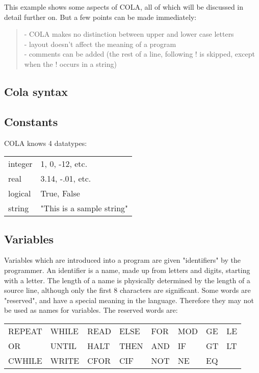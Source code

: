 This example shows some aspects of COLA, all of which will be
discussed in detail further on. But a few points can be made
immediately:

\begin{verse}
  -  COLA makes no distinction between upper and lower case letters\\
  -  layout doesn't affect the meaning of a program\\
  -  comments can be added (the rest of a line, following ! is
     skipped, except when the ! occurs in a string)\\
\end{verse}


\subsection{Cola syntax}
\subsection*{Constants}

COLA knows 4 datatypes:\\

\begin{tabular}{ l l}
integer &                  1, 0, -12, etc.\\
real    &                  3.14, -.01, etc.\\
logical &                  True, False\\
string  &                  "This is a sample string"\\
\end{tabular}



\subsection*{Variables}



Variables which are introduced into a program are given
"identifiers" by the programmer. An identifier is a name,
made up from letters and digits, starting with a letter.
The length of a name is physically determined by the length
of a source line, although only the first 8 characters are
significant.  Some words are "reserved", and have a special
meaning in the language. Therefore they may not be used as
names for variables. The reserved words are:\\

\begin{tabular}{ l l l l l l l l }
 REPEAT& WHILE &   READ&    ELSE&    FOR&     MOD&     GE&      LE\\
 OR    & UNTIL &   HALT&    THEN&    AND&     IF &     GT&      LT\\
 CWHILE& WRITE &   CFOR&    CIF &    NOT&     NE &     EQ& \hfill \\
\end{tabular}


